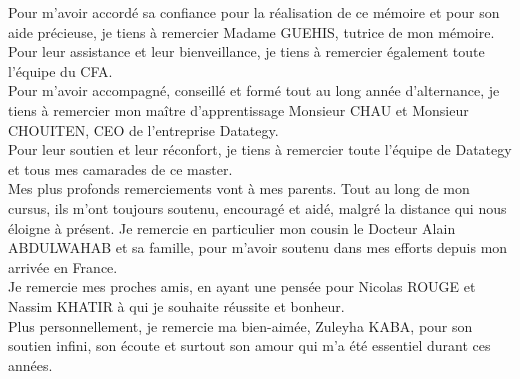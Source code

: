 \documentclass[french, a4paper, 12pt]{report}
\begin{document}
Pour m’avoir accordé sa confiance pour la réalisation de ce mémoire et pour son aide précieuse, je tiens à remercier Madame GUEHIS, tutrice de mon mémoire.\\

Pour leur assistance et leur bienveillance, je tiens à remercier également toute l'équipe du CFA. \\

Pour m’avoir accompagné, conseillé et formé tout au long année d'alternance, je tiens à remercier mon maître d'apprentissage Monsieur CHAU et Monsieur CHOUITEN, CEO de l'entreprise Datategy.\\

Pour leur soutien et leur réconfort, je tiens à remercier toute l'équipe de Datategy et tous mes camarades de ce master.\\

Mes plus profonds remerciements vont à mes parents. Tout au long de mon cursus, ils m’ont toujours soutenu, encouragé et aidé, malgré la distance qui nous éloigne à présent. Je remercie en particulier mon cousin le Docteur Alain ABDULWAHAB et sa famille, pour m’avoir soutenu dans mes efforts depuis mon arrivée en France.  \\

Je remercie mes proches amis, en ayant une pensée pour Nicolas ROUGE et Nassim KHATIR à qui je souhaite réussite et bonheur. \\

Plus personnellement, je remercie ma bien-aimée, Zuleyha KABA, pour son soutien infini, son écoute et surtout son amour qui m’a été essentiel durant ces années. 
\newpage\null\thispagestyle{empty}\newpage
\end{document}
